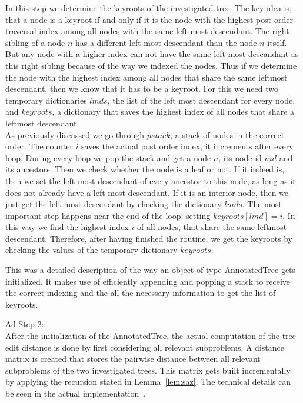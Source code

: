 In this step we determine the keyroots of the investigated tree. The key idea is, that a node is a keyroot if and only if it is the node with the highest post-order traversal index among all nodes with the same left most descendant. The right sibling of a node $n$ has a different left most descendant than the node $n$ itself. But any node with a higher index can not have the same left most descandant as this right sibling because of the way we indexed the nodes. Thus if we determine the node with the highest index among all nodes that share the same leftmost descendant, then we know that it has to be a keyroot. For this we need two temporary dictionaries $lmds$, the list of the left most descendant for every node, and $keyroots$, a dictionary that saves the highest index of all nodes that share a leftmost descendant.\\
As previously discussed we go through $pstack$, a stack of nodes in the correct order. The counter $i$ saves the actual post order index, it increments after every loop. 
During every loop we pop the stack and get a node $n$, its node id $nid$ and its ancestors. Then we check whether the node is a leaf or not. If it indeed is, then we set the left most descendant of every ancestor to this node, as long as it does not already have a left most descendant. If it is an interior node, then we just get the left most descendant by checking the dictionary $lmds$. The most important step happens near the end of the loop: setting $keyroots[lmd] = i$. In this way we find the highest index $i$ of all nodes, that share the same leftmost descendant. Therefore, after having finished the routine, we get the keyroots by checking the values of the temporary dictionary $keyroots$.

This was a detailed description of the way an object of type AnnotatedTree gets initialized. It makes use of efficiently appending and popping a stack to receive the correct indexing and the all the necessary information to get the list of keyroots.

\underline{Ad Step $2$}:\\
After the initialization of the AnnotatedTree, the actual computation of the tree edit distance is done by first considering all relevant subproblems. A distance matrix is created that stores the pairwise distance between all relevant subproblems of the two investigated trees. This matrix gets built incrementally by applying the recursion stated in Lemma~\ref{lem:saz}. The technical details can be seen in the actual implementation~\cite{Hen}.

